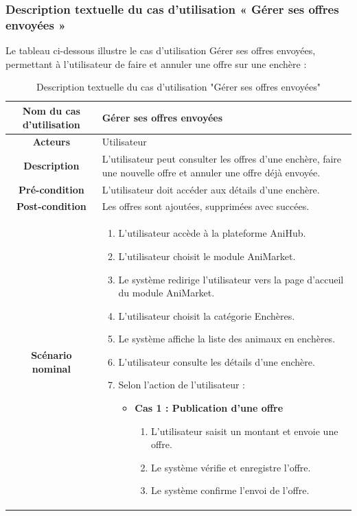 \newpage
\subsubsection{Description textuelle du cas d’utilisation « Gérer ses offres envoyées »}

Le tableau ci-dessous illustre le cas d’utilisation Gérer ses offres envoyées, permettant à l’utilisateur de faire et annuler une offre sur une enchère :
\begin{longtable}{|c|p{11cm}|}
\caption{Description textuelle du cas d’utilisation "Gérer ses offres envoyées"}
\label{tab:gerer_offres} \\
\hline
\cellcolor{coloranimarket} \textbf{Nom du cas d'utilisation } & Gérer ses offres envoyées \\
\hline
\cellcolor{coloranimarket} \textbf{Acteurs} & Utilisateur \\
\hline
\cellcolor{coloranimarket} \textbf{Description } & L’utilisateur peut consulter les offres d’une enchère, faire une nouvelle offre et annuler une offre déjà envoyée. \\
\hline
\cellcolor{coloranimarket} \textbf{Pré-condition } & L’utilisateur doit accéder aux détails d’une enchère. \\
\hline
\cellcolor{coloranimarket} \textbf{Post-condition } & Les offres sont ajoutées, supprimées avec succées. \\
\hline
\cellcolor{coloranimarket} \textbf{Scénario nominal } &
\begin{enumerate}
\item L’utilisateur accède à la plateforme AniHub.
\item L’utilisateur choisit le module AniMarket.
\item Le système redirige l’utilisateur vers la page d’accueil du module AniMarket.
\item L’utilisateur choisit la catégorie Enchères.
\item Le système affiche la liste des animaux en enchères.
\item L’utilisateur consulte les détails d’une enchère.
\item Selon l’action de l’utilisateur :

\begin{itemize}

\item \textbf{Cas 1 : Publication d’une offre}
\begin{enumerate}
\item L’utilisateur saisit un montant et envoie une offre.
\item Le système vérifie et enregistre l’offre.
\item Le système confirme l’envoi de l’offre.
\end{enumerate}



\end{itemize}
\end{enumerate}
\end{longtable}
